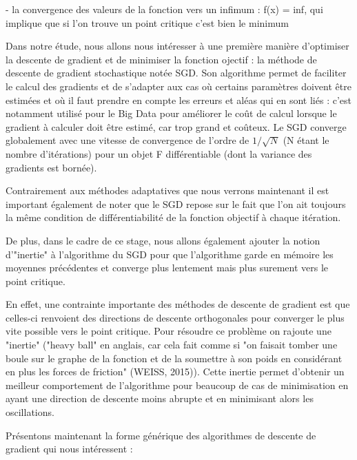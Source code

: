 \documentclass{article}
\begin{document}
- la convergence des valeurs de la fonction vers un infimum : f(x) = inf, qui implique que si l'on trouve un point critique c'est bien le minimum

\bigskip

Dans notre étude, nous allons nous intéresser à une première manière d'optimiser la descente de gradient et de minimiser la fonction ojectif : la méthode de descente de gradient stochastique notée SGD. Son algorithme permet de faciliter le calcul des gradients et de s'adapter aux cas où certains paramètres doivent être estimées et où il faut prendre en compte les erreurs et aléas qui en sont liés : c'est notamment utilisé pour le Big Data pour améliorer le coût de calcul lorsque le gradient à calculer doit être estimé, car trop grand et coûteux. Le SGD converge globalement avec une vitesse de convergence de l'ordre de $1/\sqrt{N}$ (N étant le nombre d'itérations) pour un objet F différentiable (dont la variance des gradients est bornée).

\bigskip

Contrairement aux méthodes adaptatives que nous verrons maintenant il est important également de noter que le SGD repose sur le fait que l'on ait toujours la même condition de différentiabilité de la fonction objectif à chaque itération. 

\bigskip

De plus, dans le cadre de ce stage, nous allons également ajouter la notion d'"inertie" à l'algorithme du SGD pour que l'algorithme garde en mémoire les moyennes précédentes et converge plus lentement mais plus surement vers le point critique. 

\bigskip

En effet, une contrainte importante des méthodes de descente de gradient est que celles-ci renvoient des directions de descente orthogonales pour converger le plus vite possible vers le point critique. Pour résoudre ce problème on rajoute une "inertie" ("heavy ball" en anglais, car cela fait comme si "on faisait tomber une boule sur le graphe de la fonction et de la soumettre à son poids en considérant en plus les forces de friction" (WEISS, 2015)). Cette inertie permet d'obtenir un meilleur comportement de l'algorithme pour beaucoup de cas de minimisation en ayant une direction de descente moins abrupte et en minimisant alors les oscillations.

\bigskip

Présentons maintenant la forme générique des algorithmes de descente de gradient qui nous intéressent :
\end{document}
